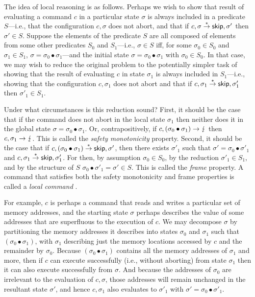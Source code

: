 \documentclass[11pt]{report}
\begin{document}
The idea of local reasoning is as follows. Perhaps we wish to show that result of evaluating a command $c$ in a particular state $\sigma$ is always included in a predicate $S$---i.e., that the configuration $c,\sigma$ does not abort, and that if $c,\sigma \stackrel{\ast}{\rightarrow} \operatorname{\mathsf{skip}},\sigma'$ then $\sigma' \in S$. Suppose the elements of the predicate $S$ are all composed of elements from some other predicates $S_0$ and $S_1$---i.e., $\sigma \in S$ iff, for some $\sigma_0 \in S_0$ and $\sigma_1 \in S_1$, $\sigma = \sigma_0 \bullet \sigma_1$---and the initial state $\sigma = \sigma_0 \bullet \sigma_1$ with $\sigma_0 \in S_0$. In that case, we may wish to reduce the original problem to the potentially simpler task of showing that the result of evaluating $c$ in state $\sigma_1$ is always included in $S_1$---i.e., showing that the configuration $c,\sigma_1$ does not abort and that if $c,\sigma_1 \stackrel{\ast}{\rightarrow} \operatorname{\mathsf{skip}},\sigma'_1$ then $\sigma'_1 \in S_1$. 

Under what circumstances is this reduction sound? First, it should be the case that if the command does not abort in the local state $\sigma_1$ then neither does it in the global state $\sigma = \sigma_0 \bullet \sigma_1$. Or, contrapositively, if $c,(\sigma_0 \bullet \sigma_1) \rightarrow \lightning$ then $c,\sigma_1 \rightarrow \lightning$. This is called the \emph{safety monotonicity} property. Second, it should be the case that if $c,(\sigma_0 \bullet \sigma_1) \stackrel{\ast}{\rightarrow} \operatorname{\mathsf{skip}},\sigma'$, then there exists $\sigma'_1$ such that $\sigma' = \sigma_0 \bullet \sigma'_1$ and $c,\sigma_1 \stackrel{\ast}{\rightarrow} \operatorname{\mathsf{skip}},\sigma'_1$. For then, by assumption $\sigma_0 \in S_0$, by the reduction $\sigma'_1 \in S_1$, and by the structure of $S$ $\sigma_0 \bullet \sigma'_1 = \sigma' \in S$. This is called the \emph{frame} property. A command that satisfies both the safety monotonicity and frame properties is called a \emph{local command} \cite{DBLP:conf/fossacs/YangO02}. 

For example, $c$ is perhaps a command that reads and writes a particular set of memory addresses, and the starting state $\sigma$ perhaps describes the value of some addresses that are superfluous to the execution of $c$. We may decompose $\sigma$ by partitioning the memory addresses it describes into states $\sigma_0$ and $\sigma_1$ such that $(\sigma_0 \bullet \sigma_1)$, with $\sigma_1$ describing just the memory locations accessed by $c$ and the remainder by $\sigma_0$. Because $(\sigma_0 \bullet \sigma_1)$ contains all the memory addresses of $\sigma_1$ and more, then if $c$ can execute successfully (i.e., without aborting) from state $\sigma_1$ then it can also execute successfully from $\sigma$. And because the addresses of $\sigma_0$ are irrelevant to the evaluation of $c,\sigma$, those addresses will remain unchanged in the resultant state $\sigma'$, and hence $c,\sigma_1$ also evaluates to $\sigma'_1$ with $\sigma' = \sigma_0 \bullet \sigma'_1$. 
\end{document}

